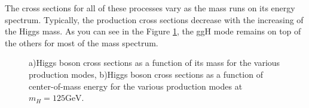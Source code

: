The cross sections for all of these processes vary as the mass runs on its energy spectrum. Typically, the production cross sections decrease with the increasing of the Higgs mass. As you can see in the Figure \ref{H_cross_sections}, the ggH mode remains on top of the others for most of the mass spectrum\cite{hussein2017higgs}. 
\begin{figure}[htb]
\centering
{}
\caption{a)Higgs boson cross sections as a function of its mass for the various production modes, b)Higgs boson cross sections as a function of center-of-mass energy for the various production modes at $m_H = 125 \text{GeV}$.}
\label{H_cross_sections}
\end{figure}

